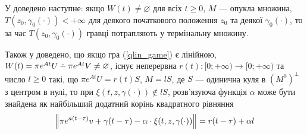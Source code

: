 У \cite{6} доведено наступне: якщо $W(t) \neq \varnothing$ для всіх $t\geq 0$,
$M$ --- опукла множина, $T(z_0, \gamma_0(\cdot)) < +\infty$ для деякого початкового положення
$z_0$ та деякої $\gamma_0(\cdot)$, то за час $T(z_0, \gamma_0(\cdot))$ гравці потрапляють у термінальну множину.

Також у \cite{6} доведено, що якщо гра (\ref{qlin_game}) є лінійною,
$W(t) = \pi e^{At}U \setdif \pi e^{At} V \neq \varnothing$, існує неперервна 
$r(t): [0; +\infty) \to [0; +\infty)$ та число $l \geq 0$ такі, що
$\pi e^{A t}U = r(t) S$, $M = l S$, де $S$ --- одинична куля в $(M^0)^\perp$ з центром в нулі, то
при $\xi(t, z, \gamma(\cdot)) \notin l S$, розв'язуюча функція $\alpha$ може бути знайдена як найбільший додатний корінь квадратного рівняння
\begin{gather}\label{lin_res_func}
    \left\Vert \pi e^{a(t-\tau)}v + \gamma(t-\tau) - \alpha \cdot \xi(t, z, \gamma(\cdot)) \right\Vert = r(t-\tau) + \alpha l
\end{gather}

